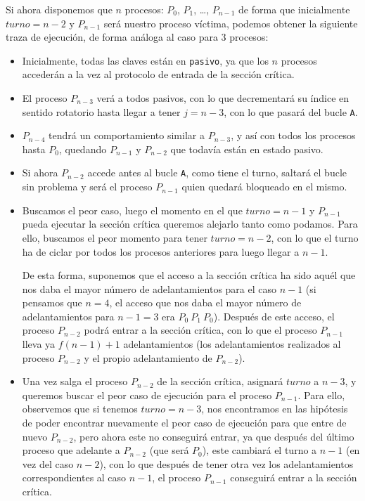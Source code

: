 \begin{description}
        Si ahora disponemos que $n$ procesos: $P_0$, $P_1$, \ldots, $P_{n-1}$ de forma que inicialmente $turno = n-2$ y $P_{n-1}$ será nuestro proceso víctima, podemos obtener la siguiente traza de ejecución, de forma análoga al caso para 3 procesos:
        \begin{itemize}
            \item Inicialmente, todas las claves están en \verb|pasivo|, ya que los $n$ procesos accederán a la vez al protocolo de entrada de la sección crítica.
            \item El proceso $P_{n-3}$ verá a todos pasivos, con lo que decrementará su índice en sentido rotatorio hasta llegar a tener $j = n-3$, con lo que pasará del bucle \verb|A|.
            \item $P_{n-4}$ tendrá un comportamiento similar a $P_{n-3}$, y así con todos los procesos hasta $P_0$, quedando $P_{n-1}$ y $P_{n-2}$ que todavía están en estado pasivo.
            \item Si ahora $P_{n-2}$ accede antes al bucle \verb|A|, como tiene el turno, saltará el bucle sin problema y será el proceso $P_{n-1}$ quien quedará bloqueado en el mismo.
            \item Buscamos el peor caso, luego el momento en el que $turno = n-1$ y $P_{n-1}$ pueda ejecutar la sección crítica queremos alejarlo tanto como podamos. Para ello, buscamos el peor momento para tener $turno = n-2$, con lo que el turno ha de ciclar por todos los procesos anteriores para luego llegar a $n-1$.

                De esta forma, suponemos que el acceso a la sección crítica ha sido aquél que nos daba el mayor número de adelantamientos para el caso $n-1$ (si pensamos que $n=4$, el acceso que nos daba el mayor número de adelantamientos para $n-1=3$ era $P_0\ P_1\ P_0$). Después de este acceso, el proceso $P_{n-2}$ podrá entrar a la sección crítica, con lo que el proceso $P_{n-1}$ lleva ya $f(n-1)+1$ adelantamientos (los adelantamientos realizados al proceso $P_{n-2}$ y el propio adelantamiento de $P_{n-2}$).
            \item Una vez salga el proceso $P_{n-2}$ de la sección crítica, asignará $turno$ a $n-3$, y queremos buscar el peor caso de ejecución para el proceso $P_{n-1}$. Para ello, observemos que si tenemos $turno = n-3$, nos encontramos en las hipótesis de poder encontrar nuevamente el peor caso de ejecución para que entre de nuevo $P_{n-2}$, pero ahora este no conseguirá entrar, ya que después del último proceso que adelante a $P_{n-2}$ (que será $P_0$), este cambiará el turno a $n-1$ (en vez del caso $n-2$), con lo que después de tener otra vez los adelantamientos correspondientes al caso $n-1$, el proceso $P_{n-1}$ conseguirá entrar a la sección crítica. 


\end{itemize}
\end{description}
